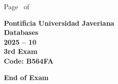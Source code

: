 \documentclass[11pt, addpoints]{exam}\usepackage[utf8]{inputenc}
\begin{document}
\begin{coverpages}
\begin{center}
			\vspace{3mm}
			\leavevmode \hspace{5mm} 
		\end{center}
	\end{coverpages}

	\footer{} {Page \thepage\ of \numpages} {}

	\centering
	\textbf{\Large Pontificia Universidad Javeriana}\\
	\textbf{\Large Databases} \\
	\textbf{\large 2025 -- 10} \\
	\textbf{\large 3rd Exam} \\
	\textbf{Code: B564FA}


	\begin{questions}
		
		
		
		
		
		
		
		
		
		
		
		
		
		
		
		
		
		
		
		
	\end{questions}

	\vspace{5mm}
	\noindent \textbf{End of Exam}
\end{document}
